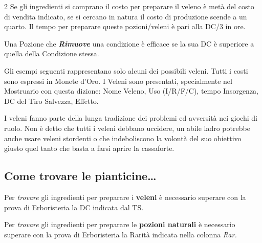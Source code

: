 \begin{multicols}{2}
Se gli ingredienti si comprano il costo per preparare il veleno è metà del costo di vendita indicato, se si cercano in natura il costo di produzione scende a un quarto. Il tempo per preparare queste pozioni/veleni è pari alla DC/3 in ore.

Una Pozione che \emph{\textbf{Rimuove}} una condizione è efficace se la sua DC è superiore a quella della Condizione stessa. 

Gli esempi seguenti rappresentano solo alcuni dei possibili veleni. Tutti i costi sono espressi in Monete d'Oro. I Veleni sono presentati, specialmente nel Mostruario con questa dizione: Nome Veleno, Uso (I/R/F/C), tempo Insorgenza, DC del Tiro Salvezza, Effetto.

\begin{narratore}
I veleni fanno parte della lunga tradizione dei problemi ed avversità nei giochi di ruolo. Non è detto che tutti i veleni debbano uccidere, un abile ladro potrebbe anche usare veleni stordenti o che indeboliscono la volontà del suo obiettivo giusto quel tanto che basta a farsi aprire la cassaforte.
\end{narratore}

\subsection{Come trovare le pianticine…}

Per \emph{trovare} gli ingredienti per preparare i \textbf{veleni} è necessario superare con la prova di Erboristeria la DC indicata dal TS.

Per \emph{trovare} gli ingredienti per preparare le \textbf{pozioni naturali} è necessario superare con la prova di Erboristeria la Rarità indicata nella colonna \emph{Rar.}

\end{multicols}

